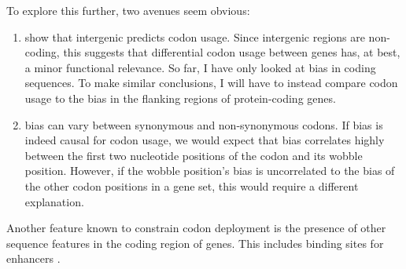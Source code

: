 To explore this further, two avenues seem obvious:

\begin{enumerate}
    \item \citet{Chen:2004} show that intergenic \gc predicts codon usage. Since
        intergenic regions are non-coding, this suggests that differential codon
        usage between genes has, at best, a minor functional relevance. So far,
        I have only looked at \gc bias in coding sequences. To make similar
        conclusions, I will have to instead compare codon usage to the \gc bias
        in the flanking regions of protein-coding genes.
    \item \gc bias can vary between synonymous and non-synonymous codons. If \gc
        bias is indeed causal for codon usage, we would expect that \gc bias
        correlates highly between the first two nucleotide positions of the
        codon and its wobble position. However, if the wobble position’s \gc
        bias is uncorrelated to the \gc bias of the other codon positions in a
        gene set, this would require a different explanation.
\end{enumerate}

Another feature known to constrain codon deployment is the presence of other
sequence features in the coding region of genes. This includes binding sites for
enhancers \citep{Blencowe:2000}.


